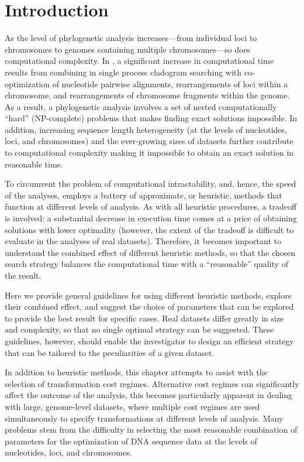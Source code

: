 \section{Introduction}

As the level of phylogenetic analysis increases---from individual loci to chromosomes to genomes containing multiple chromosomes---so does computational complexity. In \poy, a significant increase in computational time results from combining in single process cladogram searching with co-optimiza\-tion of nucleotide pairwise alignments, rearrangements of loci within a chromosome, and rearrangements of chromosome fragments within the genome. As a result, a phylogenetic analysis involves a set of nested computationally ``hard'' (NP-complete) problems that makes finding exact solutions impossible. In addition,  increasing sequence length heterogeneity (at the levels of nucleotides, loci, and chromosomes) and the ever-growing sizes of datasets further contribute to computational complexity making it impossible to obtain an exact solution in reasonable time.

To circumvent the problem of computational intractability, and, hence, the speed of the analyses, \poy employs a battery of approximate, or heuristic, methods that function at different levels of analysis. As with all heuristic procedures, a tradeoff is involved: a substantial decrease in execution time comes at a price of obtaining solutions with lower optimality (however, the extent of the tradeoff is difficult to evaluate in the analyses of real datasets). Therefore, it becomes important to understand the combined effect of different heuristic methods, so that the chosen search strategy balances the computational time with a ``reasonable'' quality of the result.

Here we provide general guidelines for using different heuristic methods, explore their combined effect, and suggest the choice of parameters that can be explored to provide the best result for specific cases. Real datasets differ greatly in size and complexity, so that no single optimal strategy can be suggested. These guidelines, however, should enable the investigator to design an efficient strategy that can be tailored to the peculiarities of a given dataset.

In addition to heuristic methods, this chapter attempts to assist with the selection of transformation cost regimes. Alternative cost regimes can significantly affect the outcome of the analysis, this becomes particularly apparent in dealing with large, genome-level datasets, where multiple cost regimes are used simultaneously to specify transformations at different levels of analysis. Many problems stem from the difficulty in selecting the most reasonable combination of parameters 
for the optimization of DNA sequence data at the levels of nucleotides, loci, and chromosomes.

